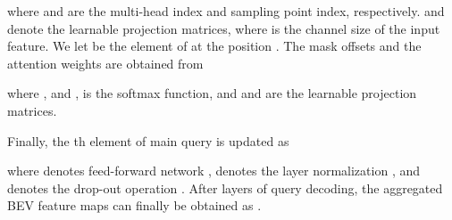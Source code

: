 \documentclass[letterpaper]{article} \usepackage{aaai23}  \usepackage{times}  \usepackage{helvet}  \usepackage{courier}  \usepackage[hyphens]{url}  \usepackage{graphicx} \urlstyle{rm} \def\UrlFont{\rm}  \usepackage{natbib}  \usepackage{caption} \frenchspacing  \setlength{\pdfpagewidth}{8.5in} \usepackage{algorithm}
\begin{document}
where  and  are the multi-head index and sampling point index, respectively.  and  denote the learnable projection matrices, where  is the channel size of the input feature. We let  be the element of  at the position . 
The mask offsets  and the attention weights  are obtained from

where , and ,  is the softmax function, and  and  are the learnable projection matrices.

Finally, the th element of main query is updated as

where  denotes feed-forward network \cite{attention},  denotes the layer normalization \cite{layernorm}, and  denotes the drop-out operation \cite{dropout}.
After  layers of query decoding, the aggregated BEV feature maps can finally be obtained as .


\renewcommand{\arraystretch}{1.0}
\end{document}
